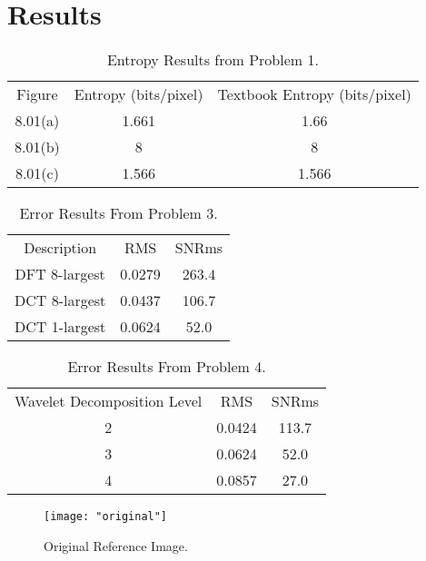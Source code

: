 \documentclass[./rarnold_project_89.tex]{subfiles}
\begin{document}
\clearpage

\section*{Results}
	
\begin{table}[htbp]
\centering
\caption{Entropy Results from Problem 1.}
\label{part1}
\begin{tabular}{|c|c|c|}
\hline
Figure & Entropy (bits/pixel)& Textbook Entropy (bits/pixel)\\ \hhline{|=|=|=|}
8.01(a)& 1.661 & 1.66\\ \hline
8.01(b)& 8 & 8\\ \hline
8.01(c)& 1.566 & 1.566\\ \hline
\end{tabular}
\end{table}	

\begin{table}[htbp]
\centering
\caption{Error Results From Problem 3.}
\label{part3}
\begin{tabular}{|c|c|c|}
\hline
Description & RMS & SNRms\\ \hhline{|=|=|=|}
DFT 8-largest& 0.0279 & 263.4\\ \hline
DCT 8-largest& 0.0437 & 106.7\\ \hline
DCT 1-largest& 0.0624 & 52.0 \\ \hline
\end{tabular}
\end{table}	

\begin{table}[htbp]
\centering
\caption{Error Results From Problem 4.}
\label{part4}
\begin{tabular}{|c|c|c|}
\hline
Wavelet Decomposition Level & RMS & SNRms\\ \hhline{|=|=|=|}
2& 0.0424 & 113.7\\ \hline
3& 0.0624 & 52.0\\ \hline
4& 0.0857 & 27.0 \\ \hline
\end{tabular}
\end{table}	

\clearpage

	\begin{figure}[!htbp]
	\centering
	\texttt{[image: "original"]}
	\captionsetup{justification=centering}
	\caption{Original Reference Image.} 
	\label{orig}
	\end{figure}
	
\end{document}
